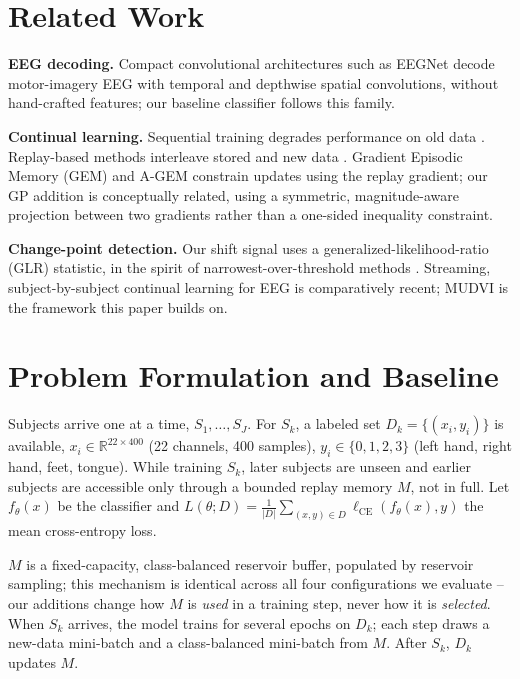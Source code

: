 \documentclass[conference]{IEEEtran}
\begin{document}
\section{Related Work}

\textbf{EEG decoding.} Compact convolutional architectures such as EEGNet \cite{lawhern2018eegnet} decode motor-imagery EEG with temporal and depthwise spatial convolutions, without hand-crafted features; our baseline classifier follows this family.

\textbf{Continual learning.} Sequential training degrades performance on old data \cite{french1999catastrophic}. Replay-based methods interleave stored and new data \cite{lopezpaz2017gem}. Gradient Episodic Memory (GEM) \cite{lopezpaz2017gem} and A-GEM \cite{chaudhry2019agem} constrain updates using the replay gradient; our GP addition is conceptually related, using a symmetric, magnitude-aware projection between two gradients rather than a one-sided inequality constraint.

\textbf{Change-point detection.} Our shift signal uses a generalized-likelihood-ratio (GLR) statistic, in the spirit of narrowest-over-threshold methods \cite{baranowski2019not}. Streaming, subject-by-subject continual learning for EEG is comparatively recent; MUDVI is the framework this paper builds on.

\section{Problem Formulation and Baseline}

Subjects arrive one at a time, $S_1,\ldots,S_J$. For $S_k$, a labeled set $D_k=\{(x_i,y_i)\}$ is available, $x_i\in\mathbb{R}^{22\times400}$ (22 channels, 400 samples), $y_i\in\{0,1,2,3\}$ (left hand, right hand, feet, tongue). While training $S_k$, later subjects are unseen and earlier subjects are accessible only through a bounded replay memory $M$, not in full. Let $f_\theta(x)$ be the classifier and $L(\theta;D)=\frac{1}{|D|}\sum_{(x,y)\in D}\ell_{\mathrm{CE}}(f_\theta(x),y)$ the mean cross-entropy loss.

$M$ is a fixed-capacity, class-balanced reservoir buffer, populated by reservoir sampling; this mechanism is identical across all four configurations we evaluate -- our additions change how $M$ is \emph{used} in a training step, never how it is \emph{selected}. When $S_k$ arrives, the model trains for several epochs on $D_k$; each step draws a new-data mini-batch and a class-balanced mini-batch from $M$. After $S_k$, $D_k$ updates $M$.
\end{document}

